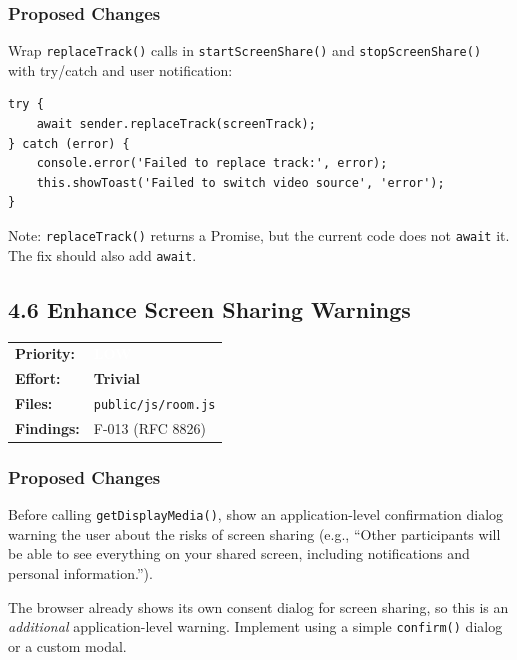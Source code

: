 \documentclass[11pt,letterpaper]{article}
\newcommand{\prilow}{\colorbox{notapplicable}{\textcolor{white}{\small\textbf{LOW}}}}
\newcommand{\efftrivial}{\colorbox{compliant!20}{\small\textbf{Trivial}}}
\begin{document}
\subsubsection{Proposed Changes}

Wrap \texttt{replaceTrack()} calls in \texttt{startScreenShare()} and \texttt{stopScreenShare()} with try/catch and user notification:

\begin{verbatim}
try {
    await sender.replaceTrack(screenTrack);
} catch (error) {
    console.error('Failed to replace track:', error);
    this.showToast('Failed to switch video source', 'error');
}
\end{verbatim}

Note: \texttt{replaceTrack()} returns a Promise, but the current code does not \texttt{await} it. The fix should also add \texttt{await}.

\subsection{4.6 Enhance Screen Sharing Warnings}

\begin{tabular}{ll}
\textbf{Priority:} & \prilow \\
\textbf{Effort:} & \efftrivial \\
\textbf{Files:} & \texttt{public/js/room.js} \\
\textbf{Findings:} & F-013 (RFC 8826) \\
\end{tabular}

\subsubsection{Proposed Changes}

Before calling \texttt{getDisplayMedia()}, show an application-level confirmation dialog warning the user about the risks of screen sharing (e.g., ``Other participants will be able to see everything on your shared screen, including notifications and personal information.'').

The browser already shows its own consent dialog for screen sharing, so this is an \textit{additional} application-level warning. Implement using a simple \texttt{confirm()} dialog or a custom modal.

\end{document}
